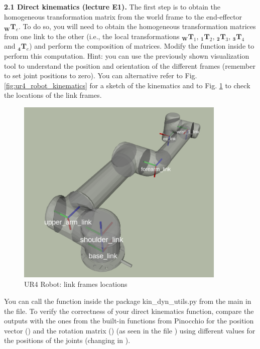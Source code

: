 \documentclass[11pt]{article}
\newcommand{\prepos}[3]{${}_{\mathbf{#2}}{\mathbf{#1}}_{#3}$}
\begin{document}
\textbf{2.1 Direct kinematics (lecture E1).} The first step is to obtain the homogeneous transformation matrix from the world frame to the end-effector \prepos{T}{W}{e}. To do so, you will need to obtain the homogeneous transformation matrices from one link to the other (i.e., the local transformations \prepos{T}{W}{1}, \prepos{T}{1}{2}, \prepos{T}{2}{3}, \prepos{T}{3}{4} and \prepos{T}{4}{e}) and perform the composition of matrices. Modify the function  inside  to perform this computation. Hint: you can use the previously shown visualization tool to understand the  position and orientation of the different frames (remember to set joint positions to zero). 
You can alternative refer to Fig. \ref{fig:ur4_robot_kinematics} for a sketch of the kinematics and to Fig.  \ref{fig:ur4_tf} to check the locations of the  link frames.


\begin{figure}[bht]
	\centering
	\includegraphics[width=10cm]{pics/ur4TF.png}
	\caption{UR4 Robot:  link frames locations}
	\label{fig:ur4_tf}
\end{figure} 


You can call the function inside the package kin\_dyn\_utils.py from the main in the  file. To verify the correctness of your direct kinematics function, compare the outputs with the ones from the built-in functions from Pinocchio for the position vector () and the rotation matrix () (as seen in the file ) using different values for the positions of the joints (changing  in ).\\
\end{document}
